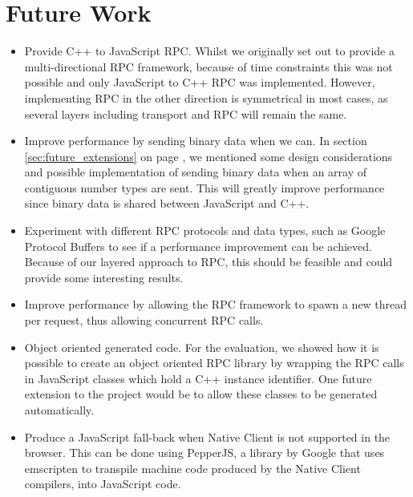 \section{Future Work} %
\label{sec:future_work}
\begin{itemize}
	\item Provide C++ to JavaScript RPC. Whilst we originally set out to provide a multi-directional RPC framework, because of time constraints this was not possible and only JavaScript to C++ RPC was implemented. However, implementing RPC in the other direction is symmetrical in most cases, as several layers including transport and RPC will remain the same.
	\item Improve performance by sending binary data when we can. In section \ref{sec:future_extensions} on page \pageref{sec:future_extensions}, we mentioned some design considerations and possible implementation of sending binary data when an array of contiguous number types are sent. This will greatly improve performance since binary data is shared between JavaScript and C++.
	\item Experiment with different RPC protocols and data types, such as Google Protocol Buffers to see if a performance improvement can be achieved. Because of our layered approach to RPC, this should be feasible and could provide some interesting results.
	\item Improve performance by allowing the RPC framework to spawn a new thread per request, thus allowing concurrent RPC calls.
	\item Object oriented generated code. For the evaluation, we showed how it is possible to create an object oriented RPC library by wrapping the RPC calls in JavaScript classes which hold a C++ instance identifier. One future extension to the project would be to allow these classes to be generated automatically.
	\item Produce a JavaScript fall-back when Native Client is not supported in the browser. This can be done using PepperJS\cite{pepperjs}, a library by Google that uses emscripten\cite{emscripten} to transpile machine code produced by the Native Client compilers, into JavaScript code.
\end{itemize}

